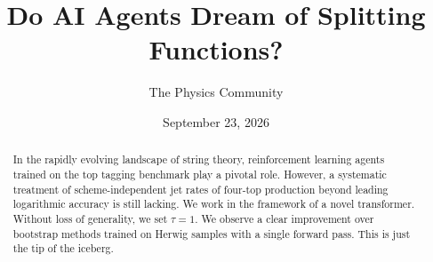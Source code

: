 \documentclass[11pt]{article}
\title{Do AI Agents Dream of Splitting Functions?}
\author{The Physics Community}
\date{September 23, 2026}
\begin{document}
\maketitle
\begin{abstract}
In the rapidly evolving landscape of string theory, reinforcement
learning agents trained on the top tagging benchmark play a pivotal
role. However, a systematic treatment of scheme-independent jet rates of
four-top production beyond leading logarithmic accuracy is still
lacking. We work in the framework of a novel transformer. Without loss
of generality, we set $\tau = 1$. We observe a clear improvement over
bootstrap methods trained on Herwig samples with a single forward pass.
This is just the tip of the iceberg.
\end{abstract}
\tableofcontents





\nocite{*}


\end{document}
